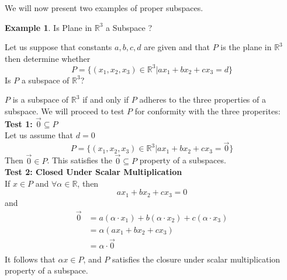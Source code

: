 \documentclass{book}
\theoremstyle{definition}
\newtheorem{example}{Example}[definition]
\theoremstyle{remark}
\newcommand{\bb}[1]{\mathbb{#1}}
\newcommand{\m}{\cdot}
\begin{document}
\newpage
We will now present two examples of proper subspaces. 
\begin{example}
Is Plane in $\bb{R}^3$ a Subspace ? 
\begin{tcolorbox}
    Let us suppose that constants $a,b,c,d$ are given and that $P$ is the plane in $\bb{R}^3$ then determine whether
    \begin{equation*}
        P = \{ (x_1,x_2,x_3) \in \bb{R}^3 | ax_1 + bx_2 + cx_3 = d \}
    \end{equation*}
    Is $P$ a subspace of $\bb{R}^3$? \\
\end{tcolorbox}
    
    $P$ is a subspace of $\bb{R}^3$ if and only if $P$ adheres to the three properties of a subspace. We will proceed to test $P$ for conformity with the three properites: \\
    
    \textbf{Test 1: $\vec{0} \subseteq P$} \\
        Let us assume that $d=0$
            \begin{equation*}
                P = \{ (x_1,x_2,x_3) \in \bb{R}^3 | ax_1 + bx_2 + cx_3 = \vec{0} \}
            \end{equation*}
        Then $ \vec{0} \in P$. This satisfies the $\vec{0} \subseteq P$ property of a subspaces. \\
    
    \textbf{Test 2: Closed Under Scalar Multiplication} \\
        If $x \in P$ and $\forall \alpha \in \bb{R}$, then 
            \begin{equation*}
                ax_1 + bx_2 + cx_3 = 0
            \end{equation*}
        and 
            \begin{align*}
                \vec{0} & = a(\alpha \m x_1) + b(\alpha \m x_2) + c(\alpha \m x_3) \\
                    & = \alpha(ax_1 + bx_2 + cx_3) \\
                    & = \alpha \m \vec{0} \\
            \end{align*}
        It follows that $\alpha x \in P$, and $P$ satisfies the closure under scalar multiplication property of a subspace. \\
    

\end{example}
\end{document}

